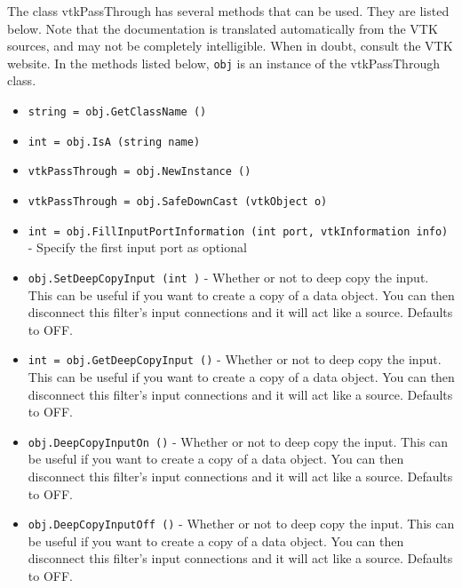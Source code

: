 The class vtkPassThrough has several methods that can be used.
  They are listed below.
Note that the documentation is translated automatically from the VTK sources,
and may not be completely intelligible.  When in doubt, consult the VTK website.
In the methods listed below, \verb|obj| is an instance of the vtkPassThrough class.
\begin{itemize}
\item  \verb|string = obj.GetClassName ()|

\item  \verb|int = obj.IsA (string name)|

\item  \verb|vtkPassThrough = obj.NewInstance ()|

\item  \verb|vtkPassThrough = obj.SafeDownCast (vtkObject o)|

\item  \verb|int = obj.FillInputPortInformation (int port, vtkInformation info)| -  Specify the first input port as optional

\item  \verb|obj.SetDeepCopyInput (int )| -  Whether or not to deep copy the input. This can be useful if you
 want to create a copy of a data object. You can then disconnect
 this filter's input connections and it will act like a source.
 Defaults to OFF.

\item  \verb|int = obj.GetDeepCopyInput ()| -  Whether or not to deep copy the input. This can be useful if you
 want to create a copy of a data object. You can then disconnect
 this filter's input connections and it will act like a source.
 Defaults to OFF.

\item  \verb|obj.DeepCopyInputOn ()| -  Whether or not to deep copy the input. This can be useful if you
 want to create a copy of a data object. You can then disconnect
 this filter's input connections and it will act like a source.
 Defaults to OFF.

\item  \verb|obj.DeepCopyInputOff ()| -  Whether or not to deep copy the input. This can be useful if you
 want to create a copy of a data object. You can then disconnect
 this filter's input connections and it will act like a source.
 Defaults to OFF.

\end{itemize}
